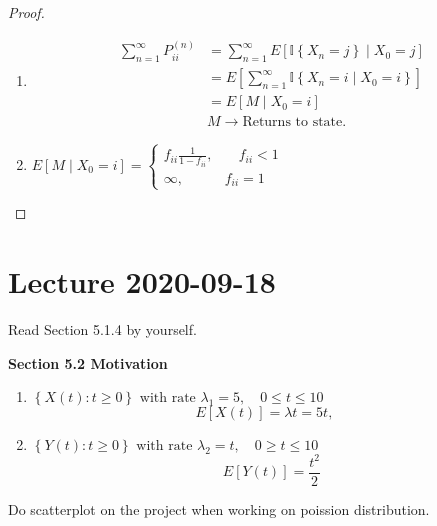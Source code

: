 \documentclass{article}
\theoremstyle{remark}
\begin{document}
 \begin{proof}
   \begin{enumerate}[label=(\roman*)]
     \item  \[
         \begin{split}
\sum_{n =1}^{\infty}  P _{ii}^{(n)}  & = \sum_{n= 1}^{\infty}  E\left[ \mathbb{I} \left\{ X_{n} = j \right\}  \mid  X_{0} = j \right]  \\
       & = E\left[ \sum_{n=1}^{ \infty}  \mathbb{I} \left\{ X_{n} = i  \mid  X_{0} = i \right\} \right] \\
       &= E\left[ M  \mid  X_{0} = i \right] \\
        & M \to  \text{Returns to state.}
         \end{split} 
     \] 
   \item $E \left[ M  \mid  X_{0} = i \right] = \begin{cases}
     f_{ii}\frac{1}{1- f_{ii}}  , &  \quad  f_{ii} < 1 \\
     \infty ,  &  f_{ii} = 1 
   \end{cases}$
   \end{enumerate}
 \end{proof}

 \newpage
 \section{Lecture 2020-09-18}%
 \label{sec:lecture_2020_09_18}
 
 \begin{tcolorbox}
   Read Section 5.1.4 by yourself.
 \end{tcolorbox}

\textbf{Section 5.2 Motivation}  
 
\begin{enumerate}[label=(\alph*)]
  \item $\left\{ X\left( t \right): t \ge 0 \right\} \text{ with rate } \lambda _{1} = 5, \quad  0 \le t \le 10 $
    \[
    E\left[ X\left( t \right) \right] = \lambda t = 5t, \quad 
    \]  
  \item $\left\{ Y\left( t \right): t \ge 0 \right\} \text{ with rate } \lambda _{2} = t, \quad  0\ge t \le 10 $\[
      E \left[ Y\left( t \right) \right] = \frac{t^2}{2} 
  \] 
\end{enumerate}

\begin{tcolorbox}
  Do scatterplot on the project when working on poission distribution.
\end{tcolorbox}
\end{document}
